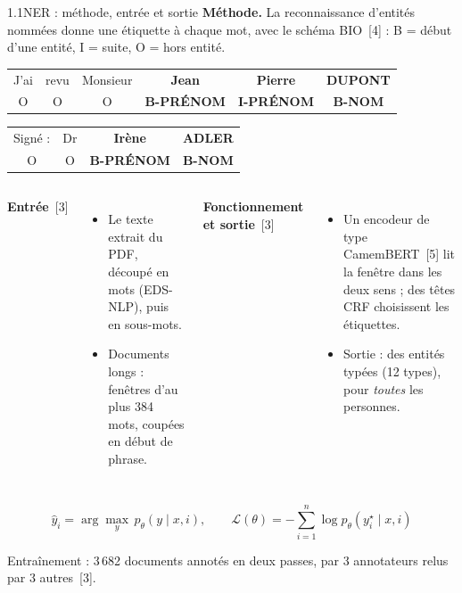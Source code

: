 \documentclass[11pt,aspectratio=169]{beamer}
\newcommand{\refs}[1]{{\color{mlblue}[#1]}}
\newcommand{\tagO}{{\color{mlgray}\scriptsize O}}
\newcommand{\tagP}[1]{{\color{mlgreen}\scriptsize\bfseries #1}}
\newcommand{\remarque}[1]{{\footnotesize\color{mlgray}#1\par}}
\begin{document}
\begin{frame}{1.1\quad NER : méthode, entrée et sortie}
  \small
  \textbf{Méthode.} La reconnaissance d'entités nommées donne une étiquette à chaque mot,
  avec le schéma BIO~\refs{4} : B = début d'une entité, I = suite, O = hors entité.

  \begin{center}
    \setlength{\tabcolsep}{2.5pt}
    \renewcommand{\arraystretch}{1.15}
    \begin{tabular}{cccccc}
      J'ai & revu & Monsieur & \textbf{Jean} & \textbf{Pierre} & \textbf{DUPONT} \\
      \tagO & \tagO & \tagO & \tagP{B-PRÉNOM} & \tagP{I-PRÉNOM} & \tagP{B-NOM}
    \end{tabular}
    \par\smallskip
    \begin{tabular}{cccc}
      Signé : & Dr & \textbf{Irène} & \textbf{ADLER} \\
      \tagO & \tagO & \tagP{B-PRÉNOM} & \tagP{B-NOM}
    \end{tabular}
  \end{center}

  \begin{columns}[T]
    \textbf{Entrée}~\refs{3}
    \begin{itemize}
      \item Le texte extrait du PDF, découpé en mots (EDS-NLP), puis en sous-mots.
      \item Documents longs : fenêtres d'au plus 384 mots, coupées en début de phrase.
    \end{itemize}
    \textbf{Fonctionnement et sortie}~\refs{3}
    \begin{itemize}
      \item Un encodeur de type CamemBERT~\refs{5} lit la fenêtre dans les deux sens ; des
        têtes CRF choisissent les étiquettes.
      \item Sortie : des entités typées (12 types), pour \emph{toutes} les personnes.
    \end{itemize}
  \end{columns}
  \[
    \hat y_i = \arg\max_{y}\, p_\theta(y \mid x, i), \qquad
    \mathcal{L}(\theta) = -\sum_{i=1}^{n} \log p_\theta\!\left(y_i^\star \mid x, i\right)
  \]
  \remarque{Entraînement : 3\,682 documents annotés en deux passes, par 3 annotateurs relus
  par 3 autres~\refs{3}.}
\end{frame}
\end{document}
